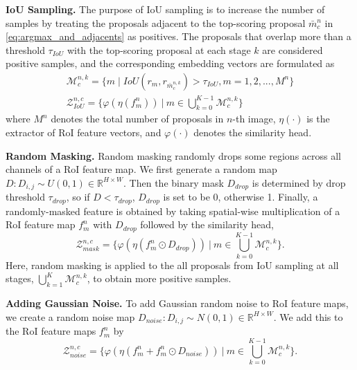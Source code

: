 \documentclass[runningheads]{llncs}
\begin{document}
\noindent\textbf{IoU Sampling.}
The purpose of IoU sampling is to increase the number of samples by treating the proposals adjacent to the top-scoring proposal $\bar{m}^n_c$ in \eqref{eq:argmax_and_adjacents} as positives. The proposals that overlap more than a threshold $\tau_{IoU}$ with the top-scoring proposal at each stage $k$ are considered positive samples, and the corresponding embedding vectors are formulated as
\begin{equation}
\begin{gathered}
    \mathcal{M}^{n,k}_c = \{m \mid IoU(r_m, r_{\bar{m}^{n,k}_c}) > \tau_{IoU}, m = 1, 2, ..., M^n \}\\
\mathcal{Z}^{n,c}_{IoU} = \{ \varphi(\eta{(f^n_m)}) \ | \ m \in \bigcup_{k=0}^{K-1} \mathcal{M}^{n,k}_c \}
\label{eq:IoU_sampling}
\end{gathered}
\end{equation}
where $M^n$ denotes the total number of proposals in $n$-th image, $\eta(\cdot)$ is the extractor of RoI feature vectors, and $\varphi(\cdot)$ denotes the similarity head.


\noindent\textbf{Random Masking.}
Random masking randomly drops some regions across all channels of a RoI feature map.
We first generate a random map $D: D_{i,j}\sim U(0,1) \in \mathbb{R}^{H \times W}$.
Then the binary mask $D_{drop}$ is determined by drop threshold $\tau_{drop}$, so if $D < \tau_{drop}$, $D_{drop}$ is set to be 0, otherwise 1.
Finally, a randomly-masked feature is obtained by taking spatial-wise multiplication of a RoI feature map $f^n_m$ with $D_{drop}$ followed by the similarity head,
\begin{equation}
\mathcal{Z}^{n,c}_{mask} = \{ \varphi(\eta{(f^n_m \odot D_{drop})}) \ | \ m \in \bigcup_{k=0}^{K-1} \mathcal{M}^{n,k}_c \}
\label{eq:mask_sampling}
.\end{equation}
Here, random masking is applied to the all proposals from IoU sampling at all stages, $\bigcup_{k=1}^K \mathcal{M}^{n,k}_c$, to obtain more positive samples.

\noindent\textbf{Adding Gaussian Noise.}
To add Gaussian random noise to RoI feature maps, we create a random noise map $D_{noise}: D_{i,j} \sim N(0,1) \in \mathbb{R}^{H \times W}$.
We add this to the RoI feature maps $f^n_m$ by
\begin{equation}
\mathcal{Z}^{n,c}_{noise} = \{ \varphi(\eta(f^n_m + f^n_m \odot D_{noise})) \ | \ m \in \bigcup_{k=0}^{K-1} \mathcal{M}^{n,k}_c \}
\label{eq:noise_sampling}
.\end{equation}
\end{document}
